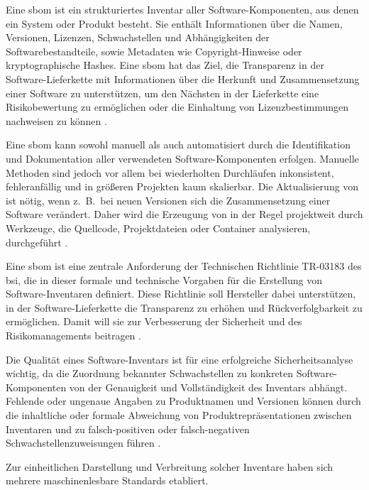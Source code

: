 Eine \acrfull{sbom} ist ein strukturiertes Inventar aller Software-Komponenten, aus denen ein System oder Produkt besteht.
Sie enthält Informationen über die Namen, Versionen, Lizenzen, Schwachstellen und Abhängigkeiten der Softwarebestandteile, sowie Metadaten wie Copyright-Hinweise oder kryptographische Hashes.
Eine \acrshort{sbom} hat das Ziel, die Transparenz in der Software-Lieferkette mit Informationen über die Herkunft und Zusammensetzung einer Software zu unterstützen, um den Nächsten in der Lieferkette eine Risikobewertung zu ermöglichen oder die Einhaltung von Lizenzbestimmungen nachweisen zu können \autocite{Bi_Xia_Xing_Lu_Zhu_2023}.

Eine \acrshort{sbom} kann sowohl manuell als auch automatisiert durch die Identifikation und Dokumentation aller verwendeten Software-Komponenten erfolgen.
Manuelle Methoden sind jedoch vor allem bei wiederholten Durchläufen inkonsistent, fehleranfällig und in größeren Projekten kaum skalierbar.
Die Aktualisierung von  ist nötig, wenn z.\ B.\ bei neuen Versionen sich die Zusammensetzung einer Software verändert.
Daher wird die Erzeugung von  in der Regel projektweit durch Werkzeuge, die Quellcode, Projektdateien oder Container analysieren, durchgeführt \autocite{Bi_Xia_Xing_Lu_Zhu_2023}.

Eine \acrshort{sbom} ist eine zentrale Anforderung der Technischen Richtlinie TR-03183 des \acrfull{bsi}, die in dieser formale und technische Vorgaben für die Erstellung von Software-Inventaren definiert.
Diese Richtlinie soll Hersteller dabei unterstützen, in der Software-Lieferkette die Transparenz zu erhöhen und Rückverfolgbarkeit zu ermöglichen.
Damit will sie zur Verbesserung der Sicherheit und des Risikomanagements beitragen \autocite{BSI_TR03183}.

Die Qualität eines Software-Inventars ist für eine erfolgreiche Sicherheitsanalyse wichtig, da die Zuordnung bekannter Schwachstellen zu konkreten Software-Komponenten von der Genauigkeit und Vollständigkeit des Inventars abhängt.
Fehlende oder ungenaue Angaben zu Produktnamen und Versionen können durch die inhaltliche oder formale Abweichung von Produktrepräsentationen zwischen Inventaren und  zu falsch-positiven oder falsch-negativen Schwachstellenzuweisungen führen \autocite{Idrissi_Sebai_Faroukhi_Mahouachi_2024}.

Zur einheitlichen Darstellung und Verbreitung solcher Inventare haben sich mehrere maschinenlesbare Standards etabliert.

